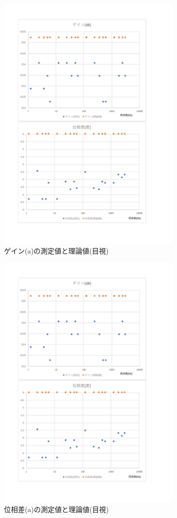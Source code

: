 \documentclass[uplatex, 11pt,a4j, titlepage]{jsarticle}
\begin{document}
\begin{figure}[h]
    \centering
    \includegraphics[width=9cm]{mokushi1.pdf}
    \caption{ゲイン(a)の測定値と理論値(目視)}
    \label{mokushi1}
\end{figure}

\begin{figure}[h]
    \centering
    \includegraphics[width=9cm]{mokushi2.pdf}
    \caption{位相差(a)の測定値と理論値(目視)}
    \label{mokushi2}
\end{figure}
\end{document}
